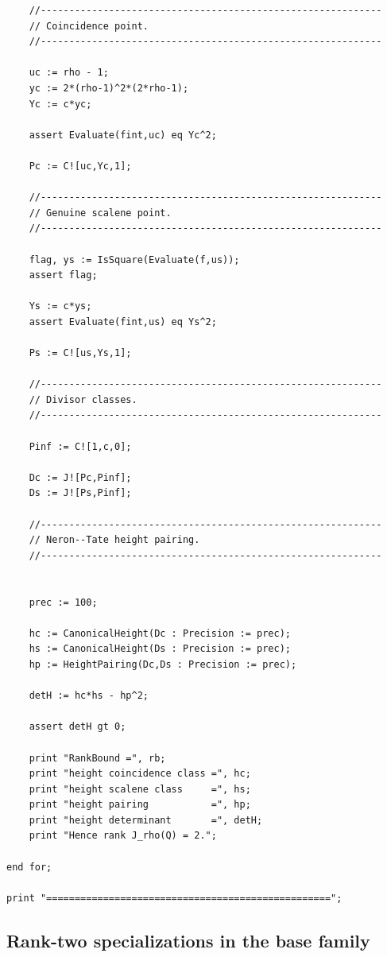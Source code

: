 \documentclass[11pt]{amsart}
\theoremstyle{plain}
\theoremstyle{remark}
\theoremstyle{plain}
\begin{document}
\begin{verbatim}
    //------------------------------------------------------------
    // Coincidence point.
    //------------------------------------------------------------

    uc := rho - 1;
    yc := 2*(rho-1)^2*(2*rho-1);
    Yc := c*yc;

    assert Evaluate(fint,uc) eq Yc^2;

    Pc := C![uc,Yc,1];

    //------------------------------------------------------------
    // Genuine scalene point.
    //------------------------------------------------------------

    flag, ys := IsSquare(Evaluate(f,us));
    assert flag;

    Ys := c*ys;
    assert Evaluate(fint,us) eq Ys^2;

    Ps := C![us,Ys,1];

    //------------------------------------------------------------
    // Divisor classes.
    //------------------------------------------------------------

    Pinf := C![1,c,0];

    Dc := J![Pc,Pinf];
    Ds := J![Ps,Pinf];

    //------------------------------------------------------------
    // Neron--Tate height pairing.
    //------------------------------------------------------------


    prec := 100;

    hc := CanonicalHeight(Dc : Precision := prec);
    hs := CanonicalHeight(Ds : Precision := prec);
    hp := HeightPairing(Dc,Ds : Precision := prec);

    detH := hc*hs - hp^2;

    assert detH gt 0;

    print "RankBound =", rb;
    print "height coincidence class =", hc;
    print "height scalene class     =", hs;
    print "height pairing           =", hp;
    print "height determinant       =", detH;
    print "Hence rank J_rho(Q) = 2.";

end for;

print "==================================================";
\end{verbatim}


\subsection{Rank-two specializations in the base family} \label{app:rank-two-base}
\end{document}
